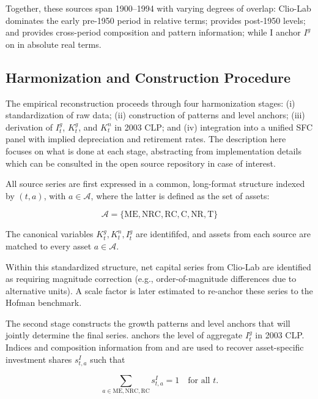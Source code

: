 \documentclass[11pt,a4paper]{article}
\begin{document}
Together, these sources span 1900--1994 with varying degrees of overlap: Clio-Lab dominates the early
pre-1950 period in relative terms; \citet{Hofman2000} provides post-1950 levels; \citet{Tafunell2013} and \citet{TafunellDucoing2016} provides cross-period composition and pattern information; while I anchor $I^g$ on \citet{PerezEyzaguirre2019} in absolute real terms.

\subsection{Harmonization and Construction Procedure}\label{subsec:harmonization}

The empirical reconstruction proceeds through four harmonization stages: (i) standardization of raw data; (ii) construction of patterns and level anchors; (iii) derivation of $I_t^{g}$, $K_t^{g}$, and $K_t^{n}$ in 2003 CLP; and (iv) integration into a unified SFC panel with implied depreciation and retirement rates. The description here focuses on what is done at each stage, abstracting from implementation details which can be consulted in the open source repository in case of interest.

All source series are first expressed in a common, long-format structure indexed by $(t,a)$, with $a \in \mathcal{A}$, where the latter is defined as the set of assets: 

\begin{equation}
\mathcal{A} = \{\text{ME},\text{NRC},\text{RC},\text{C},\text{NR},\text{T}\}    
\end{equation}

The canonical variables ${K_t^{g},K_t^{n},I_t^{g}}$ are identififed, and assets from each source are matched to every asset $a \in \mathcal{A}$. 

Within this standardized structure, net capital series from Clio-Lab are identified as requiring magnitude correction (e.g., order-of-magnitude differences due to alternative units). A scale factor is later estimated to re-anchor these series to the Hofman benchmark.

The second stage constructs the growth patterns and level anchors that will jointly determine the final series. \citet{PerezEyzaguirre2019} anchors the level of aggregate $I_t^{g}$ in 2003 CLP. Indices and composition information from \citet{Hofman2000} and \citet{Tafunell2013} are used to recover asset-specific investment shares $s_{t,a}^{I}$ such that

\begin{equation}
\sum_{a \in {\text{ME},\text{NRC},\text{RC}}} s_{t,a}^{I} = 1 \quad \text{for all } t.\end{equation}
\end{document}
